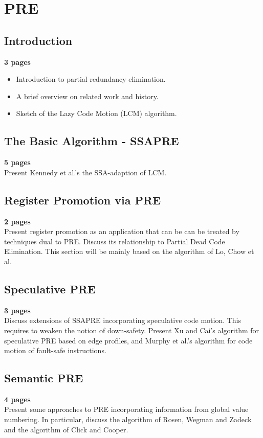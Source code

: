 \chapter{PRE }

\section{Introduction}
{\bf 3 pages}
\begin{itemize} 
\item Introduction to partial redundancy elimination.
\item A brief overview on related work and history.
\item Sketch of the Lazy Code Motion (LCM) algorithm.
\end{itemize}

\section*{The Basic Algorithm - SSAPRE}
{\bf 5 pages} \\
Present Kennedy et al.'s the  SSA-adaption  of LCM. 

\section*{Register Promotion via PRE}
{\bf 2 pages} \\
Present register promotion as an application that can be 
can be treated by techniques dual to PRE. Discuss its 
relationship to Partial Dead Code Elimination. This section 
will be mainly based on the algorithm of Lo, Chow et al. 
 
\section*{Speculative  PRE}
{\bf 3 pages} \\
Discuss  extensions of SSAPRE incorporating speculative code 
motion. This requires to weaken the notion of down-safety. 
Present Xu and Cai's algorithm for speculative PRE based on 
edge profiles,  and  Murphy et al.'s algorithm for code motion 
of fault-safe instructions. 

\section*{Semantic PRE}
{\bf 4 pages} \\
Present some approaches to PRE incorporating information from global 
value numbering. In particular, discuss the  algorithm of Rosen, Wegman and 
 Zadeck and the algorithm of Click and Cooper. 







